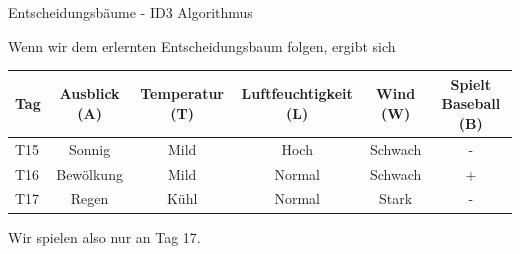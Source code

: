 \begin{task}[credit=16]{Entscheidungsbäume - ID3 Algorithmus}
\begin{subtask}[points=3,title=Vorhersage]
\begin{solution}
Wenn wir dem erlernten Entscheidungsbaum folgen, ergibt sich
\begin{table}[h!]
	\centering
	\begin{tabular}{l|c|c|c|c|c}
		\toprule
		\textbf{Tag} & \textbf{Ausblick (A)} & \textbf{Temperatur (T)}  & \textbf{Luftfeuchtigkeit (L)} & \textbf{Wind (W)}     & \textbf{Spielt Baseball (B)} \\
		\midrule
		T15 & Sonnig    & Mild        & Hoch     & Schwach & -       \\
		T16 & Bewölkung & Mild        & Normal   & Schwach & +       \\
		T17 & Regen     & Kühl        & Normal   & Stark   & -       \\
		\bottomrule
	\end{tabular}
\end{table}
\newline
Wir spielen also nur an Tag 17.
\end{solution}

\end{subtask}
\end{task}